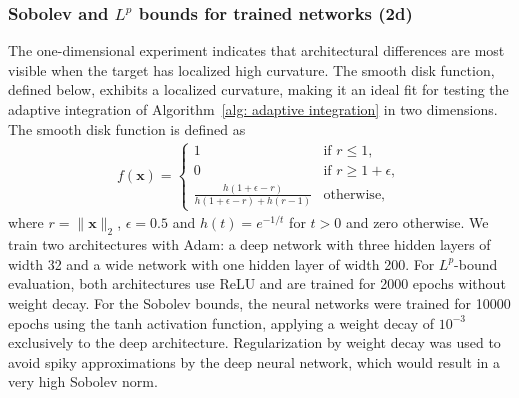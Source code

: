 \documentclass[a4paper, 11pt]{article}
\begin{document}
    
	
	\subsubsection{Sobolev and $L^p$ bounds for trained networks (2d)}
	\label{sec: Sobolev and $L^p$ bounds for trained networks (2d)}
	The one-dimensional experiment indicates that architectural differences are most visible when the target has localized high curvature. 
	The smooth disk function, defined below, exhibits a localized curvature, making it an ideal fit for testing the adaptive integration of Algorithm~\ref{alg: adaptive integration} in two dimensions.
	The smooth disk function is defined as
	\begin{align}
		\label{eq: smooth disk}
		f(\mathbf{x}) = \begin{cases} 
			1 & \text{if } r \le 1, \\
			0 & \text{if } r \ge 1 + \epsilon, \\
			\frac{h(1+\epsilon - r)}{h(1+\epsilon - r) + h(r - 1)} & \text{otherwise},
		\end{cases}
	\end{align}
	where $r = \|\mathbf{x}\|_2$, $\epsilon = 0.5$ and $h(t) = e^{-1/t}$ for $t>0$ and zero otherwise.
	We train two architectures with Adam: a deep network with three hidden layers of width 32 and a wide network with one hidden layer of width 200.
	For $L^p$-bound evaluation, both architectures use ReLU and are trained for 2000 epochs without weight decay.
	For the Sobolev bounds, the neural networks were trained for 10000 epochs using the tanh activation function, applying a weight decay of $10^{-3}$ exclusively to the deep architecture. 
	Regularization by weight decay was used to avoid spiky approximations by the deep neural network, which would result in a very high Sobolev norm.  
	
\end{document}
